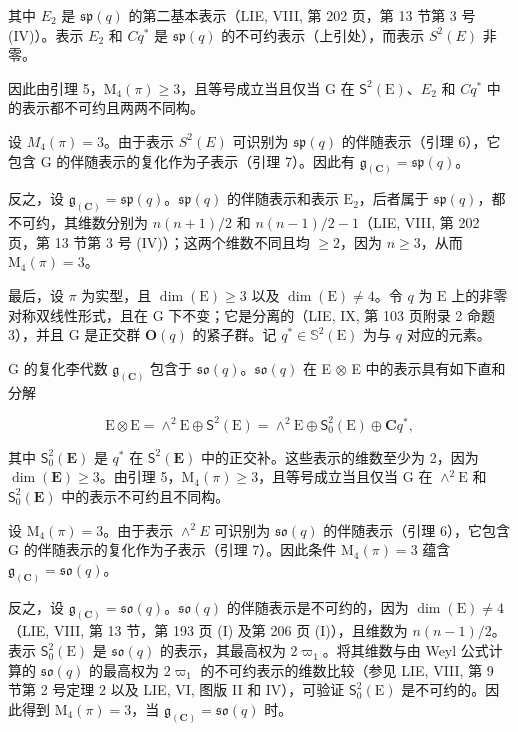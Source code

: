 其中 \(E_{2}\) 是 \(\mathfrak{sp}(q)\) 的第二基本表示（LIE, VIII, 第 202 页，第 13 节第 3 号 (IV)）。表示 \(E_{2}\) 和 \(C q^{*}\) 是 \(\mathfrak{sp}(q)\) 的不可约表示（上引处），而表示 \(S^{2}(E)\) 非零。

因此由引理 5，\(\mathrm{M}_{4}(\pi) \geqslant 3\)，且等号成立当且仅当 G 在 \(\mathsf{S}^{2}(\mathrm{E})\)、\(E_{2}\) 和 \(Cq^{*}\) 中的表示都不可约且两两不同构。

设 \(M_{4}(\pi)=3\)。由于表示 \(S^{2}(E)\) 可识别为 \(\mathfrak{sp}(q)\) 的伴随表示（引理 6），它包含 G 的伴随表示的复化作为子表示（引理 7）。因此有 \(\mathfrak{g}_{(\mathbf{C})}=\mathfrak{sp}(q)\)。

反之，设 \(\mathfrak{g}_{(\mathbf{C})} = \mathfrak{sp}(q)\)。\(\mathfrak{sp}(q)\) 的伴随表示和表示 \(\mathrm{E}_2\)，后者属于 \(\mathfrak{sp}(q)\)，都不可约，其维数分别为 \(n(n + 1)/2\) 和 \(n(n - 1)/2 - 1\)（LIE, VIII, 第 202 页，第 13 节第 3 号 (IV)）；这两个维数不同且均 \(\geqslant 2\)，因为 \(n \geqslant 3\)，从而 \(\mathrm{M}_4(\pi) = 3\)。

最后，设 \(\pi\) 为实型，且 \(\dim(\mathrm{E}) \geqslant 3\) 以及 \(\dim(\mathrm{E}) \neq 4\)。令 \(q\) 为 \(\mathrm{E}\) 上的非零对称双线性形式，且在 G 下不变；它是分离的（LIE, IX, 第 103 页附录 2 命题 3），并且 \(\mathrm{G}\) 是正交群 \(\mathbf{O}(q)\) 的紧子群。记 \(q^{*} \in \mathbb{S}^{2}(\mathrm{E})\) 为与 \(q\) 对应的元素。

G 的复化李代数 \(\mathfrak{g}_{(\mathbf{C})}\) 包含于 \(\mathfrak{so}(q)\)。\(\mathfrak{so}(q)\) 在 E \(\otimes\) E 中的表示具有如下直和分解

\[
\mathrm{E} \otimes \mathrm{E} = \wedge^ {2} \mathrm{E} \oplus \mathsf {S} ^ {2} (\mathrm{E}) = \wedge^ {2} \mathrm{E} \oplus \mathsf {S} _ {0} ^ {2} (\mathrm{E}) \oplus \mathbf {C} q ^ {*},
\]

其中 \(\mathsf{S}_{0}^{2}(\mathbf{E})\) 是 \(q^{*}\) 在 \(\mathsf{S}^{2}(\mathbf{E})\) 中的正交补。这些表示的维数至少为 2，因为 \(\dim(\mathbf{E})\geqslant3\)。由引理 5，\(\mathrm{M}_{4}(\pi)\geqslant3\)，且等号成立当且仅当 G 在 \(\wedge^{2}\mathrm{E}\) 和 \(\mathsf{S}_{0}^{2}(\mathbf{E})\) 中的表示不可约且不同构。

设 \(\mathrm{M}_{4}(\pi)=3\)。由于表示 \(\wedge^{2}E\) 可识别为 \(\mathfrak{so}(q)\) 的伴随表示（引理 6），它包含 G 的伴随表示的复化作为子表示（引理 7）。因此条件 \(\mathrm{M}_{4}(\pi)=3\) 蕴含 \(\mathfrak{g}_{(\mathbf{C})}=\mathfrak{so}(q)\)。

反之，设 \(\mathfrak{g}_{(\mathbf{C})} = \mathfrak{so}(q)\)。\(\mathfrak{so}(q)\) 的伴随表示是不可约的，因为 \(\dim(\mathrm{E}) \neq 4\)（LIE, VIII, 第 13 节，第 193 页 (I) 及第 206 页 (I)），且维数为 \(n(n-1)/2\)。表示 \(\mathsf{S}_0^2(\mathrm{E})\) 是 \(\mathfrak{so}(q)\) 的表示，其最高权为 \(2\varpi_1\)。将其维数与由 Weyl 公式计算的 \(\mathfrak{so}(q)\) 的最高权为 \(2\varpi_1\) 的不可约表示的维数比较（参见 LIE, VIII, 第 9 节第 2 号定理 2 以及 LIE, VI, 图版 II 和 IV），可验证 \(\mathsf{S}_0^2(\mathrm{E})\) 是不可约的。因此得到 \(\mathrm{M}_4(\pi) = 3\)，当 \(\mathfrak{g}_{(\mathbf{C})} = \mathfrak{so}(q)\) 时。

